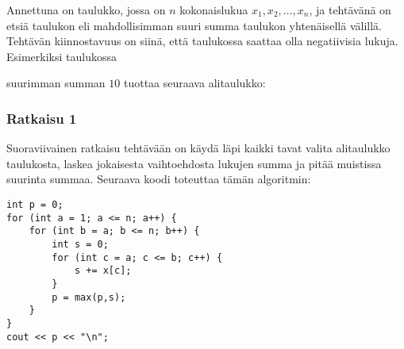 Annettuna on taulukko, jossa on $n$ kokonaislukua
$x_1,x_2,\ldots,x_n$, ja tehtävänä on etsiä
taulukon 
eli mahdollisimman suuri summa
taulukon yhtenäisellä välillä.
Tehtävän kiinnostavuus on siinä, että taulukossa
saattaa olla negatiivisia lukuja.
Esimerkiksi taulukossa
\begin{center}
\end{center}
\begin{samepage}
suurimman summan $10$ tuottaa seuraava alitaulukko:
\begin{center}
\end{center}
\end{samepage}


\subsubsection{Ratkaisu 1}

Suoraviivainen ratkaisu tehtävään on käydä
läpi kaikki tavat valita alitaulukko taulukosta,
laskea jokaisesta vaihtoehdosta lukujen summa
ja pitää muistissa suurinta summaa.
Seuraava koodi toteuttaa tämän algoritmin:

\begin{lstlisting}
int p = 0;
for (int a = 1; a <= n; a++) {
    for (int b = a; b <= n; b++) {
        int s = 0;
        for (int c = a; c <= b; c++) {
            s += x[c];
        }
        p = max(p,s);
    }
}
cout << p << "\n";
\end{lstlisting}

